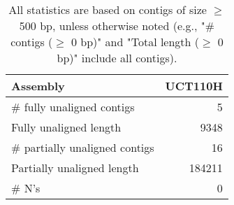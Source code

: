 \documentclass[12pt,a4paper]{article}
\begin{document}
\begin{table}[ht]
\begin{center}
\caption{All statistics are based on contigs of size $\geq$ 500 bp, unless otherwise noted (e.g., "\# contigs ($\geq$ 0 bp)" and "Total length ($\geq$ 0 bp)" include all contigs).}
\begin{tabular}{|l*{1}{|r}|}
\hline
Assembly & UCT110H \\ \hline
\# fully unaligned contigs & 5 \\ \hline
Fully unaligned length & 9348 \\ \hline
\# partially unaligned contigs & 16 \\ \hline
Partially unaligned length & 184211 \\ \hline
\# N's & 0 \\ \hline
\end{tabular}
\end{center}
\end{table}
\end{document}
